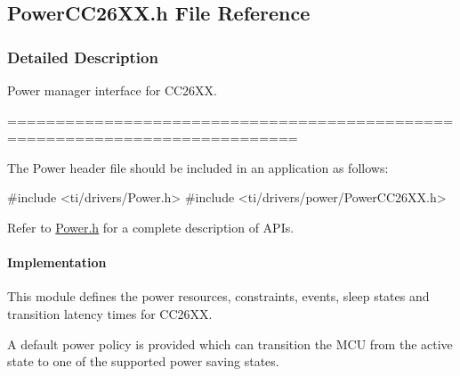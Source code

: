 \subsection{Power\+C\+C26\+X\+X.\+h File Reference}
\label{_power_c_c26_x_x_8h}


\subsubsection{Detailed Description}
Power manager interface for C\+C26\+X\+X. 

============================================================================

The Power header file should be included in an application as follows\+: 
\begin{DoxyCode}
\textcolor{preprocessor}{#include <ti/drivers/Power.h>}
\textcolor{preprocessor}{#include <ti/drivers/power/PowerCC26XX.h>}
\end{DoxyCode}


Refer to \hyperlink{_power_8h}{Power.\+h} for a complete description of A\+P\+Is.

\paragraph*{Implementation}

This module defines the power resources, constraints, events, sleep states and transition latency times for C\+C26\+X\+X.

A default power policy is provided which can transition the M\+C\+U from the active state to one of the supported power saving states. 

